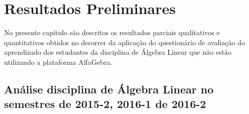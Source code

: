 \chapter{Resultados Preliminares}
\label{cap:resultados}
\noindent No presente capítulo são descritos os resultados parciais qualitativos e quantitativos obtidos no decorrer da aplicação do questionário de avaliação do aprendizado dos estudantes da disciplina de Álgebra Linear que não estão utilizando a plataforma AlfaGebra.

\section{Análise disciplina de Álgebra Linear no semestres de 2015-2, 2016-1 de 2016-2}

\label{disciplina_3_ultimos_semestre}

